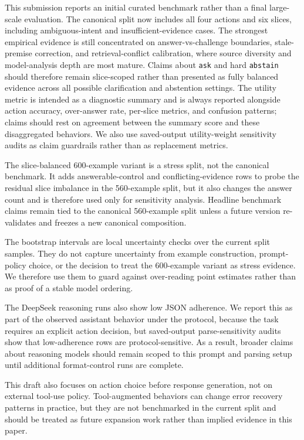 This submission reports an initial curated benchmark rather than a final large-scale evaluation. The canonical split now includes all four actions and six slices, including ambiguous-intent and insufficient-evidence cases. The strongest empirical evidence is still concentrated on answer-vs-challenge boundaries, stale-premise correction, and retrieval-conflict calibration, where source diversity and model-analysis depth are most mature. Claims about \texttt{ask} and hard \texttt{abstain} should therefore remain slice-scoped rather than presented as fully balanced evidence across all possible clarification and abstention settings. The utility metric is intended as a diagnostic summary and is always reported alongside action accuracy, over-answer rate, per-slice metrics, and confusion patterns; claims should rest on agreement between the summary score and these disaggregated behaviors. We also use saved-output utility-weight sensitivity audits as claim guardrails rather than as replacement metrics.

The slice-balanced 600-example variant is a stress split, not the canonical benchmark. It adds answerable-control and conflicting-evidence rows to probe the residual slice imbalance in the 560-example split, but it also changes the answer count and is therefore used only for sensitivity analysis. Headline benchmark claims remain tied to the canonical 560-example split unless a future version re-validates and freezes a new canonical composition.

The bootstrap intervals are local uncertainty checks over the current split samples. They do not capture uncertainty from example construction, prompt-policy choice, or the decision to treat the 600-example variant as stress evidence. We therefore use them to guard against over-reading point estimates rather than as proof of a stable model ordering.

The DeepSeek reasoning runs also show low JSON adherence. We report this as part of the observed assistant behavior under the protocol, because the task requires an explicit action decision, but saved-output parse-sensitivity audits show that low-adherence rows are protocol-sensitive. As a result, broader claims about reasoning models should remain scoped to this prompt and parsing setup until additional format-control runs are complete.

This draft also focuses on action choice before response generation, not on external tool-use policy. Tool-augmented behaviors can change error recovery patterns in practice, but they are not benchmarked in the current split and should be treated as future expansion work rather than implied evidence in this paper\citep{schick-etal-2023-toolformer}.

